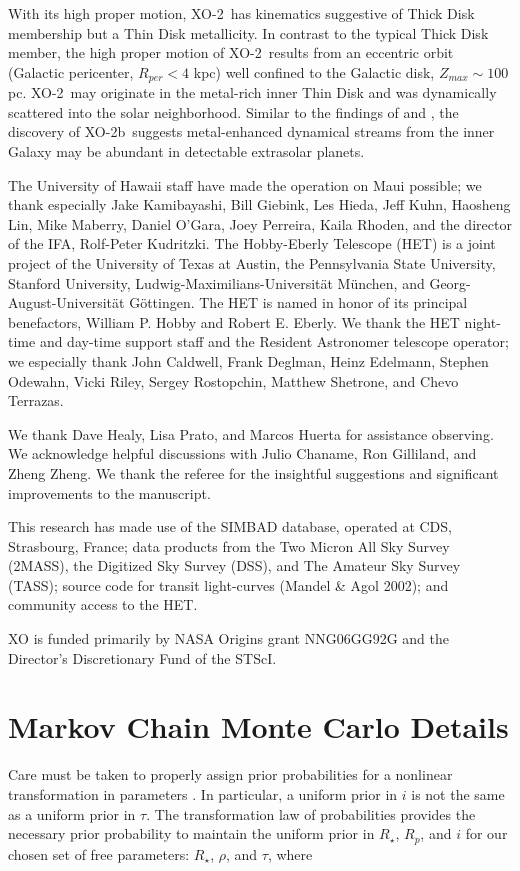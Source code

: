 \documentclass{emulateapj}
\newcommand{\xonb}{XO-2b}
\newcommand{\xon}{XO-2}
\begin{document}
With its high proper motion, \xon\ has kinematics suggestive of Thick
Disk membership but a Thin Disk metallicity.  In contrast to the typical
Thick Disk member, the high proper motion of \xon\ results from an
eccentric orbit (Galactic pericenter, $R_{per}<4$ kpc) well confined
to the Galactic disk, $Z_{max}\sim 100$ pc.  \xon\ may originate in
the metal-rich inner Thin Disk and was dynamically scattered into the
solar neighborhood.  Similar to the findings of
\citet{FAM05} and \citet{ECU07}, the discovery of
\xonb\ suggests metal-enhanced dynamical streams from the inner Galaxy
may be abundant in detectable extrasolar planets.

\acknowledgments

The University of Hawaii staff have made the operation on Maui possible; we
thank especially Jake Kamibayashi, Bill Giebink, Les Hieda,
Jeff Kuhn, Haosheng Lin, Mike Maberry, Daniel O'Gara, 
Joey Perreira, Kaila Rhoden, and the director of the IFA, Rolf-Peter Kudritzki.
The Hobby-Eberly Telescope (HET) is a joint project of the University of Texas at Austin, the Pennsylvania State University, Stanford University, Ludwig-Maximilians-Universit\"{a}t M\"{u}nchen, and Georg-August-Universit\"{a}t G\"{o}ttingen.  The HET is named in honor of its principal benefactors, William P. Hobby and Robert E. Eberly.  We thank the HET night-time and day-time support staff and the Resident Astronomer telescope operator; we especially thank John Caldwell, Frank Deglman, Heinz Edelmann, Stephen Odewahn, Vicki Riley, Sergey Rostopchin, Matthew Shetrone, and Chevo Terrazas.

We thank Dave Healy, Lisa Prato, and Marcos Huerta for assistance
observing.  We acknowledge helpful discussions with Julio Chaname, Ron
Gilliland, and Zheng Zheng.  We thank the referee for the insightful
suggestions and significant improvements to the manuscript.

This research has made use of the SIMBAD database, operated at CDS, Strasbourg, France;
data products from the Two Micron All Sky Survey (2MASS),
the Digitized Sky Survey (DSS), and The Amateur Sky Survey (TASS);
source code for transit light-curves (Mandel \& Agol 2002);
and community access to the HET.


XO is funded primarily by NASA Origins grant NNG06GG92G and the Director's
Discretionary Fund of the STScI.

\appendix
\section{Markov Chain Monte Carlo Details}\label{apx:mcmc}
Care must be taken to properly assign prior probabilities for a
nonlinear transformation in parameters \citep{CHU03}.  In particular,
a uniform prior in $i$ is not the same as a uniform prior in $\tau$.
The transformation law of probabilities provides the necessary prior
probability to maintain the uniform prior in $R_{\star}$, $R_{p}$, and
$i$ for our chosen set of free parameters: $R_{\star}$, $\rho$, and $\tau$, where
\end{document}
